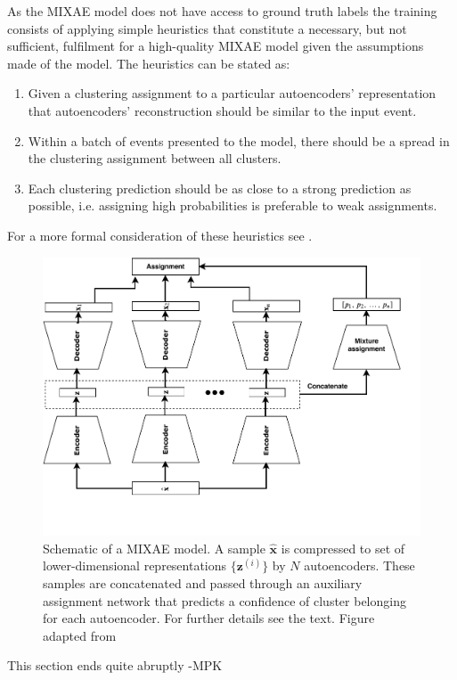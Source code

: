\documentclass[review,number,sort&compress]{elsarticle}
\begin{document}
As the MIXAE model does not have access to ground truth labels the training consists of applying simple heuristics that constitute a necessary, but not sufficient, fulfilment for a high-quality MIXAE model given the assumptions made of the model. The heuristics can be stated as: 
\begin{enumerate}
	\item  Given a clustering assignment to a particular autoencoders' representation that autoencoders' reconstruction should be similar to the input event. 
	\item Within a batch of events presented to the model, there should be a spread in the clustering assignment between all clusters. 
	\item Each clustering prediction should be as close to a strong prediction as possible, i.e. assigning high probabilities is preferable to weak assignments.
\end{enumerate}

\noindent For a more formal consideration of these heuristics see \citet{Zhang}.

\begin{figure}[tb]
	\centering
	\includegraphics[width=.8\textwidth]{plots/mixae.pdf}
	\caption[Mixture of autoencoders schematic]{Schematic of a MIXAE model. A sample $\hat{\boldsymbol{x}}$ is compressed to set of lower-dimensional representations $\{\boldsymbol{z}^{(i)}\}$ by $N$ autoencoders. These samples are concatenated and passed through an auxiliary assignment network that predicts a confidence of cluster belonging for each autoencoder. For further details see the text. Figure adapted from \citet{Zhang}}
	\label{fig:mixae}
\end{figure}
{\color{blue} This section ends quite abruptly -MPK}
\end{document}
